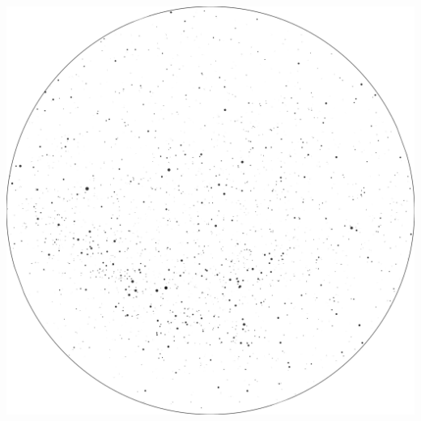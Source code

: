 \documentclass{./SAS-class-skygen}
\begin{document}
	\vspace{0.5cm}
    \begin{center}
    \includegraphics[width=\textwidth]{./pics/skychart43.png}
    \end{center}
    
    
\end{document}
